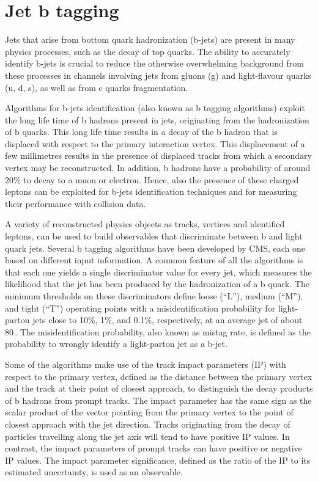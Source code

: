 \section{Jet b tagging}\label{sec:btag}

Jets that arise from bottom quark hadronization (b-jets) are present in many physics processes,
such as the decay of top quarks. The ability to accurately identify b-jets is crucial to reduce the otherwise overwhelming background from these processes in channels involving jets from gluons (g) and light-flavour quarks (u, d, s), as well as from c quarks fragmentation.

Algorithms for b-jets identification (also known as b tagging algorithms) exploit the long life time of b hadrons present in jets, originating from the hadronization of b quarks. This long life time results in a decay of the b hadron that is displaced with respect to the primary interaction vertex. This displacement of a few millimetres results in the presence of displaced tracks from which a secondary vertex may be reconstructed. In addition, b hadrons have a probability of around 20\% to decay to a muon or electron. Hence, also the presence of these charged leptons can be exploited for b-jets identification techniques and for measuring their performance with collision data.

A variety of reconstructed physics objects as tracks, vertices and identified leptons, can be used to build observables that discriminate between b and light quark jets. Several b tagging algorithms have been developed by CMS, each one based on different input information. A common feature of all the algorithms is that each one yields a single discriminator value for every jet, which measures the likelihood that the jet has been produced by the hadronization of a b quark. The minimum thresholds on these discriminators define loose (``L''), medium (``M''), and tight (``T'') operating points with a misidentification probability for light-parton jets close to 10\%, 1\%, and 0.1\%, respectively, at an average jet \pt of about 80\,\GeV. The misidentification probability, also known as mistag rate, is defined as the probability to wrongly identify a light-parton jet as a b-jet.

Some of the algorithms make use of the track impact parameters (IP) with respect to the primary vertex, defined as the distance between the primary vertex and the track at their point of closest approach, to distinguish the decay products of b hadrons from prompt tracks. The impact parameter has the same sign as the scalar product of the vector pointing from the primary vertex to the point of closest approach with the jet direction. Tracks originating from the decay of particles travelling along the jet axis will tend to have positive IP values. In contrast, the impact parameters of prompt tracks can have positive or negative IP values. The impact parameter significance, defined as the ratio of the IP to its estimated uncertainty, is used as an observable.

